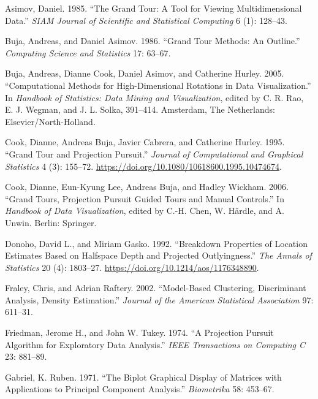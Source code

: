 \documentclass[
  12pt,
]{interact}
\newlength{\cslhangindent}
\newenvironment{CSLReferences}[2] %
 {\begin{list}{}{%
  \setlength{\itemindent}{0pt}
  \setlength{\leftmargin}{0pt}
  \setlength{\parsep}{0pt}
  \ifodd #1
   \setlength{\leftmargin}{\cslhangindent}
   \setlength{\itemindent}{-1\cslhangindent}
  \fi
  \setlength{\itemsep}{#2\baselineskip}}}
 {\end{list}}
\begin{document}
\label{refs}
\begin{CSLReferences}{1}{0}
Asimov, Daniel. 1985. {``{T}he {G}rand {T}our: {A} {T}ool for {V}iewing
{M}ultidimensional {D}ata.''} \emph{SIAM Journal of Scientific and
Statistical Computing} 6 (1): 128--43.

Buja, Andreas, and Daniel Asimov. 1986. {``{G}rand {T}our {M}ethods:
{A}n {O}utline.''} \emph{Computing Science and Statistics} 17: 63--67.

Buja, Andreas, Dianne Cook, Daniel Asimov, and Catherine Hurley. 2005.
{``{C}omputational {M}ethods for {H}igh-{D}imensional {R}otations in
{D}ata {V}isualization.''} In \emph{Handbook of Statistics: Data Mining
and Visualization}, edited by C. R. Rao, E. J. Wegman, and J. L. Solka,
391--414. Amsterdam, The Netherlands: Elsevier/North-Holland.

Cook, Dianne, Andreas Buja, Javier Cabrera, and Catherine Hurley. 1995.
{``Grand Tour and Projection Pursuit.''} \emph{Journal of Computational
and Graphical Statistics} 4 (3): 155--72.
\url{https://doi.org/10.1080/10618600.1995.10474674}.

Cook, Dianne, Eun-Kyung Lee, Andreas Buja, and Hadley Wickham. 2006.
{``{G}rand {T}ours, {P}rojection {P}ursuit {G}uided {T}ours and {M}anual
{C}ontrols.''} In \emph{Handbook of {D}ata {V}isualization}, edited by
C.-H. Chen, W. Härdle, and A. Unwin. Berlin: Springer.

Donoho, David L., and Miriam Gasko. 1992. {``{Breakdown Properties of
Location Estimates Based on Halfspace Depth and Projected
Outlyingness}.''} \emph{The Annals of Statistics} 20 (4): 1803--27.
\url{https://doi.org/10.1214/aos/1176348890}.

Fraley, Chris, and Adrian Raftery. 2002. {``Model-Based {C}lustering,
{D}iscriminant {A}nalysis, {D}ensity {E}stimation.''} \emph{Journal of
the American Statistical Association} 97: 611--31.

Friedman, Jerome H., and John W. Tukey. 1974. {``{A} {P}rojection
{P}ursuit {A}lgorithm for {E}xploratory {D}ata {A}nalysis.''} \emph{IEEE
Transactions on Computing C} 23: 881--89.

Gabriel, K. Ruben. 1971. {``The {B}iplot {G}raphical {D}isplay of
{M}atrices with {A}pplications to {P}rincipal {C}omponent {A}nalysis.''}
\emph{Biometrika} 58: 453--67.


\end{CSLReferences}
\end{document}
